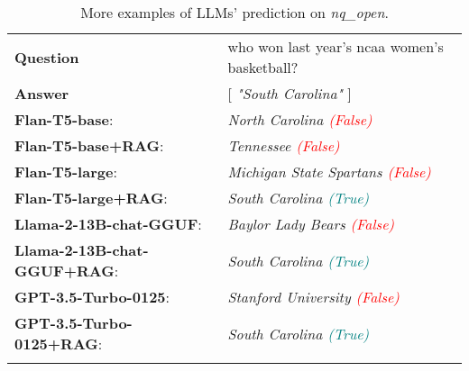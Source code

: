 \begin{table*}
{\begin{tabular}{ll}
    \textbf{Question} & who won last year's ncaa women's basketball? \\
    \textbf{Answer} & [ \emph{"South Carolina"} ] \\
    \textbf{Flan-T5-base}: & \emph{North Carolina \textcolor{red}{(False)}} \\
    \textbf{Flan-T5-base+RAG}: & \emph{Tennessee \textcolor{red}{(False)}} \\
    \textbf{Flan-T5-large}: & \emph{Michigan State Spartans \textcolor{red}{(False)}} \\
    \textbf{Flan-T5-large+RAG}: & \emph{South Carolina \textcolor{teal}{(True)}} \\
    \textbf{Llama-2-13B-chat-GGUF}: & \emph{Baylor Lady Bears \textcolor{red}{(False)}} \\
    \textbf{Llama-2-13B-chat-GGUF+RAG}: & \emph{South Carolina \textcolor{teal}{(True)}} \\
    \textbf{GPT-3.5-Turbo-0125}: & \emph{Stanford University \textcolor{red}{(False)}} \\
    \textbf{GPT-3.5-Turbo-0125+RAG}: & \emph{South Carolina \textcolor{teal}{(True)}} \\
    & \phantom{question: how long does it take a whale shark to mature? answer: around 30 years} \\

    \bottomrule
    \end{tabular}
}
    \caption{More examples of LLMs' prediction on \emph{nq\_open}.}
    \label{tab:cases}
\end{table*}